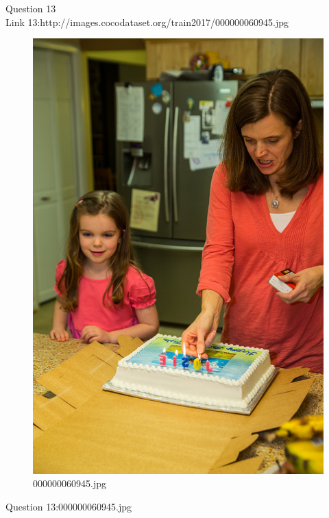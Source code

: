 Question 13\\
Link 13:http://images.cocodataset.org/train2017/000000060945.jpg
    \begin{figure}[h]
        \centering
        \includegraphics[width=0.8\linewidth]{../image set/easy/000000060945.jpg}
        \caption{000000060945.jpg}
    \end{figure}
    Question 13:000000060945.jpg

